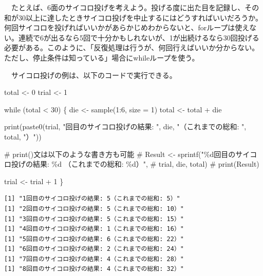 \documentclass[
  a4paper,
  pandoc,
  ja=standard,
  jafont=haranoaji]{bxjsbook}
\newenvironment{Shaded}{\begin{snugshade}}{\end{snugshade}}
\newcommand{\AttributeTok}[1]{\textcolor[rgb]{0.00,0.48,0.65}{#1}}
\newcommand{\CommentTok}[1]{\textcolor[rgb]{0.37,0.37,0.37}{#1}}
\newcommand{\ControlFlowTok}[1]{\textcolor[rgb]{0.00,0.48,0.65}{#1}}
\newcommand{\DecValTok}[1]{\textcolor[rgb]{0.68,0.00,0.00}{#1}}
\newcommand{\FunctionTok}[1]{\textcolor[rgb]{0.28,0.35,0.67}{#1}}
\newcommand{\NormalTok}[1]{\textcolor[rgb]{0.00,0.48,0.65}{#1}}
\newcommand{\OtherTok}[1]{\textcolor[rgb]{0.00,0.48,0.65}{#1}}
\newcommand{\SpecialCharTok}[1]{\textcolor[rgb]{0.37,0.37,0.37}{#1}}
\newcommand{\StringTok}[1]{\textcolor[rgb]{0.13,0.47,0.30}{#1}}
\begin{document}
　たとえば、6面のサイコロ投げを考えよう。投げる度に出た目を記録し、その和が30以上に達したときサイコロ投げを中止するにはどうすればいいだろうか。何回サイコロを投げればいいかがあらかじめわからないと、forループは使えない。連続で6が出るなら5回で十分かもしれないが、1が出続けるなら30回投げる必要がある。このように、「反復処理は行うが、何回行えばいいか分からない。ただし、停止条件は知っている」場合にwhileループを使う。

　サイコロ投げの例は、以下のコードで実行できる。

\begin{Shaded}
\begin{Highlighting}[numbers=left,,]
\NormalTok{total }\OtherTok{\textless{}{-}} \DecValTok{0}
\NormalTok{trial }\OtherTok{\textless{}{-}} \DecValTok{1}

\ControlFlowTok{while}\NormalTok{ (total }\SpecialCharTok{\textless{}} \DecValTok{30}\NormalTok{) \{}
\NormalTok{  die  }\OtherTok{\textless{}{-}} \FunctionTok{sample}\NormalTok{(}\DecValTok{1}\SpecialCharTok{:}\DecValTok{6}\NormalTok{, }\AttributeTok{size =} \DecValTok{1}\NormalTok{)}
\NormalTok{  total }\OtherTok{\textless{}{-}}\NormalTok{ total }\SpecialCharTok{+}\NormalTok{ die}
  
  \FunctionTok{print}\NormalTok{(}\FunctionTok{paste0}\NormalTok{(trial, }\StringTok{"回目のサイコロ投げの結果: "}\NormalTok{, die,}
               \StringTok{"（これまでの総和: "}\NormalTok{, total, }\StringTok{"）"}\NormalTok{))}
  
  \CommentTok{\# print()文は以下のような書き方も可能}
  \CommentTok{\# Result \textless{}{-} sprintf("\%d回目のサイコロ投げの結果: \%d （これまでの総和: \%d）", }
  \CommentTok{\#                   trial, die, total)}
  \CommentTok{\# print(Result)}
  
\NormalTok{  trial }\OtherTok{\textless{}{-}}\NormalTok{ trial }\SpecialCharTok{+} \DecValTok{1}
\NormalTok{\}}
\end{Highlighting}
\end{Shaded}

\begin{verbatim}
[1] "1回目のサイコロ投げの結果: 5（これまでの総和: 5）"
[1] "2回目のサイコロ投げの結果: 5（これまでの総和: 10）"
[1] "3回目のサイコロ投げの結果: 5（これまでの総和: 15）"
[1] "4回目のサイコロ投げの結果: 1（これまでの総和: 16）"
[1] "5回目のサイコロ投げの結果: 6（これまでの総和: 22）"
[1] "6回目のサイコロ投げの結果: 2（これまでの総和: 24）"
[1] "7回目のサイコロ投げの結果: 4（これまでの総和: 28）"
[1] "8回目のサイコロ投げの結果: 4（これまでの総和: 32）"
\end{verbatim}
\end{document}
